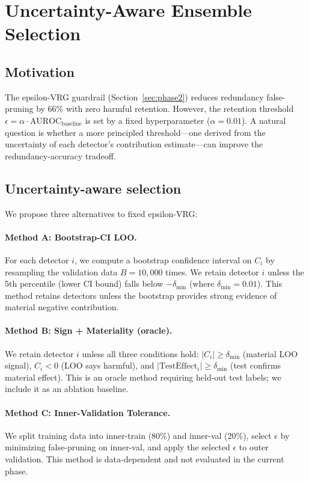 \section{Uncertainty-Aware Ensemble Selection}
\label{sec:phase4}

\subsection{Motivation}

The epsilon-VRG guardrail (Section~\ref{sec:phase2}) reduces redundancy false-pruning by 66\% with zero harmful retention. However, the retention threshold $\epsilon = \alpha \cdot \text{AUROC}_{\text{baseline}}$ is set by a fixed hyperparameter ($\alpha = 0.01$). A natural question is whether a more principled threshold---one derived from the uncertainty of each detector's contribution estimate---can improve the redundancy-accuracy tradeoff.

\subsection{Uncertainty-aware selection}

We propose three alternatives to fixed epsilon-VRG:

\paragraph{Method A: Bootstrap-CI LOO.}
For each detector $i$, we compute a bootstrap confidence interval on $C_i$ by resampling the validation data $B = 10{,}000$ times. We retain detector $i$ unless the 5th percentile (lower CI bound) falls below $-\delta_{\min}$ (where $\delta_{\min} = 0.01$). This method retains detectors unless the bootstrap provides strong evidence of material negative contribution.

\paragraph{Method B: Sign + Materiality (oracle).}
We retain detector $i$ unless all three conditions hold: $|C_i| \geq \delta_{\min}$ (material LOO signal), $C_i < 0$ (LOO says harmful), and $|\text{TestEffect}_i| \geq \delta_{\min}$ (test confirms material effect). This is an oracle method requiring held-out test labels; we include it as an ablation baseline.

\paragraph{Method C: Inner-Validation Tolerance.}
We split training data into inner-train (80\%) and inner-val (20\%), select $\epsilon$ by minimizing false-pruning on inner-val, and apply the selected $\epsilon$ to outer validation. This method is data-dependent and not evaluated in the current phase.

